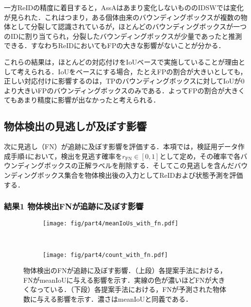         一方ReIDの精度に着目すると，AssAはあまり変化しないもののIDSWでは変化が見られた．これはつまり，ある個体由来のバウンディングボックスが複数の物体として分裂して認識されているが，ほとんどのバウンディングボックスが一つのIDに割り当てられ，分裂したバウンディングボックスが少量であったと推測できる．すなわちReIDにおいてもFPの大きな影響がないことが分かる．

        これらの結果は，ほとんどの対応付けをIoUベースで実施していることが理由として考えられる．IoUをベースにする場合，たとえFPの割合が大きいとしても，正しい対応付けに影響するのは，TPのバウンディングボックスに対してIoUが$0$より大きいFPのバウンディングボックスのみである．よってFPの割合が大きくてもあまり精度に影響が出なかったと考えられる．

    \subsection{物体検出の見逃しが及ぼす影響}
    \label{subsec:FNeffect}

    次に見逃し（FN）が追跡に及ぼす影響を評価する．本項では，検証用データ作成手順4において，検出を見逃す確率を$r_{\text{FN}} \in [0, 1]$として定め，その確率で各バウンディングボックスの正解ラベルを削除する．そしてこの見逃しを含んだバウンディングボックス集合を物体検出後の入力としてReIDおよび状態予測を評価する．

        \subsubsection{結果1 物体検出FNが追跡に及ぼす影響}

        \begin{figure}[t]
            \begin{subfigure}[t]{\linewidth}
                \centering
                \texttt{[image: fig/part4/meanIoUs\_with\_fn.pdf]}
            \end{subfigure}
            \\
            \begin{subfigure}[t]{\linewidth}
                \centering
                \texttt{[image: fig/part4/count\_with\_fn.pdf]}
            \end{subfigure}
            \caption[物体検出のFNが追跡に及ぼす影響]{物体検出のFNが追跡に及ぼす影響．（上段）各提案手法における，FNがmeanIoUに与える影響を示す．実線の色が濃いほどFNが大きくなっている．（下段）各提案手法における，FNが予測された物体数に与える影響を示す．濃さはmeanIoUと同義である．}
            \label{fig:FN_effect}
        \end{figure}


